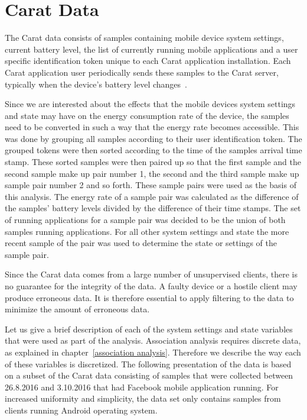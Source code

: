 \section{Carat Data}

The Carat data consists of samples containing mobile device system settings, current battery level, the list of currently running mobile applications and a user specific identification token unique to each Carat application installation. Each Carat application user periodically sends these samples to the Carat server, typically when the device's battery level changes~\cite{Oliner:2013:CCE:2517351.2517354}. 

Since we are interested about the effects that the mobile devices system settings and state may have on the energy consumption rate of the device, the samples need to be converted in such a way that the energy rate becomes accessible. This was done by grouping all samples according to their user identification token. The grouped tokens were then sorted according to the time of the samples arrival time stamp. These sorted samples were then paired up so that the first sample and the second sample make up pair number 1, the second and the third sample make up sample pair number 2 and so forth. These sample pairs were used as the basis of this analysis. The energy rate of a sample pair was calculated as the difference of the samples' battery levels divided by the difference of their time stamps. The set of running applications for a sample pair was decided to be the union of both samples running applications. For all other system settings and state the more recent sample of the pair was used to determine the state or settings of the sample pair.

Since the Carat data comes from a large number of unsupervised clients, there is no guarantee for the integrity of the data. A faulty device or a hostile client may produce erroneous data. It is therefore essential to apply filtering to the data to minimize the amount of erroneous data. 

Let us give a brief description of each of the system settings and state variables that were used as part of the analysis. Association analysis requires discrete data, as explained in chapter~\ref{association analysis}. Therefore we describe the way each of these variables is discretized. The following presentation of the data is based on a subset of the Carat data consisting of samples that were collected between 26.8.2016 and 3.10.2016 that had Facebook mobile application running. For increased uniformity and simplicity, the data set only contains samples from clients running Android operating system. 

